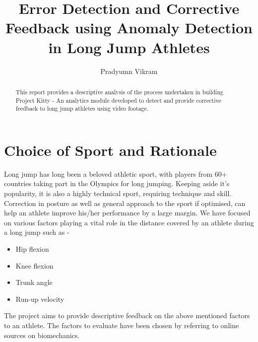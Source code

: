 \documentclass[12pt, letterpaper]{article}
\title{Error Detection and Corrective Feedback using Anomaly Detection in Long Jump Athletes}
\author{Pradyumn Vikram}
\begin{document}
\maketitle

\tableofcontents

\begin{abstract}
This report provides a descriptive analysis of the process undertaken in building Project Kitty
 - An analytics module developed to detect and provide corrective feedback to long jump athletes using
 video footage. 
\end{abstract}

\section{Choice of Sport and Rationale}

Long jump has long been a beloved athletic sport, with players from 60+ countries
taking part in the Olympics for long jumping. Keeping aside it's popularity, it is 
also a highly technical sport, requiring technique and skill. Correction in posture
as well as general approach to the sport if optimised, can help an athlete improve his/her
 performance by a large margin. We have focused on various factors playing a vital role 
 in the distance covered by an athlete during a long jump such as - 
 \begin{itemize}
    \item Hip flexion
    \item Knee flexion
    \item Trunk angle
    \item Run-up velocity
 \end{itemize}
 The project aims to provide descriptive feedback 
 on the above mentioned factors to an athlete. The factors to evaluate have been
 chosen by referring to online sources on biomechanics.
\end{document}
